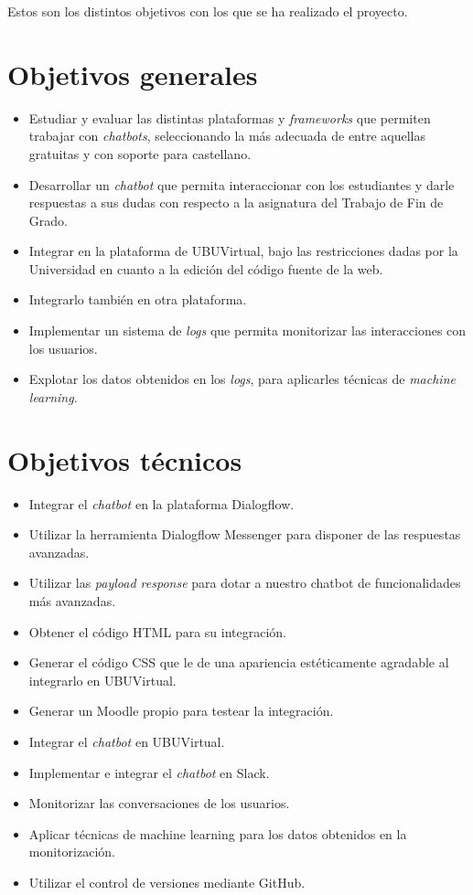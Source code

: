 
Estos son los distintos objetivos con los que se ha realizado el proyecto.

\section{Objetivos generales}\label{objetivos-generales}

\begin{itemize}
	\tightlist
	\item
	Estudiar y evaluar las distintas plataformas y \textit{frameworks} que permiten trabajar con \emph{chatbots}, seleccionando la más adecuada de entre aquellas gratuitas y con soporte para castellano.
	\item
	Desarrollar un \emph{chatbot} que permita interaccionar con los estudiantes y darle respuestas a sus dudas con respecto a la asignatura del Trabajo de Fin de Grado.
	\item
	Integrar en la plataforma de UBUVirtual, bajo las restricciones dadas por la Universidad en cuanto a la edición del código fuente de la web.
	\item 
	Integrarlo también en otra plataforma.
	\item
	Implementar un sistema de \emph{logs} que permita monitorizar las interacciones con los usuarios.
	\item
	Explotar los datos obtenidos en los \emph{logs}, para aplicarles técnicas de \emph{machine learning}. 
\end{itemize}


\section{Objetivos técnicos}\label{objetivos-tecnicos}

\begin{itemize}
	\tightlist
	\item
	Integrar el \emph{chatbot} en la plataforma Dialogflow.
	\item
	Utilizar la herramienta Dialogflow Messenger para disponer de las respuestas avanzadas.
	\item 
	Utilizar las \emph{payload response} para dotar a nuestro chatbot de funcionalidades más avanzadas.
	\item
	Obtener el código HTML para su integración.
	\item
	Generar el código CSS que le de una apariencia estéticamente agradable al integrarlo en UBUVirtual.
	\item
	Generar un Moodle propio para testear la integración.
	\item
	Integrar el \emph{chatbot} en UBUVirtual.
	\item
	Implementar e integrar el \emph{chatbot} en Slack.
	\item
	Monitorizar las conversaciones de los usuarios.
	\item
	Aplicar técnicas de machine learning para los datos obtenidos en la monitorización.
	\item
	Utilizar el control de versiones mediante GitHub.
	
	
	
\end{itemize}